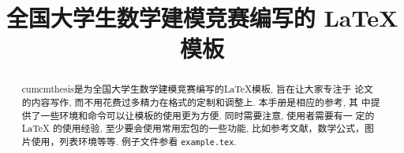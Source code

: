 \documentclass[withoutpreface,bwprint]{cumcmthesis} %
\title{全国大学生数学建模竞赛编写的 \LaTeX{} 模板}
\begin{document}
 \maketitle
 \begin{abstract}
cumcmthesis是为全国大学生数学建模竞赛编写的\LaTeX{}模板, 旨在让大家专注于 论文的内容写作, 而不用花费过多精力在格式的定制和调整上. 本手册是相应的参考, 其 中提供了一些环境和命令可以让模板的使用更为方便. 同时需要注意, 使用者需要有一 定的 \LaTeX{} 的使用经验, 至少要会使用常用宏包的一些功能, 比如参考文献，数学公式，图片使用，列表环境等等. 例子文件参看 \texttt{example.tex}.











\end{abstract}

\end{document}

